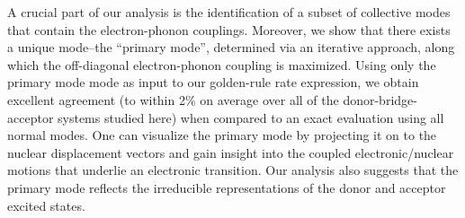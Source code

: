 A crucial part of our analysis is the identification of a subset of collective modes that contain
the electron-phonon couplings.  Moreover, we show that there exists a unique mode--the ``primary mode'',
determined via an iterative
approach, along which  the off-diagonal electron-phonon coupling is maximized.   Using only the primary mode
mode as input to our golden-rule rate expression, we obtain excellent
agreement (to within 2\% on average over   all of the donor-bridge-acceptor systems studied here)
when compared to an exact evaluation using all normal modes.   One can visualize the primary mode by projecting it on to the
nuclear displacement vectors and gain insight into the coupled electronic/nuclear motions that underlie an electronic
transition.   Our analysis also suggests that the primary  mode reflects the irreducible representations of the
donor and acceptor excited states.






